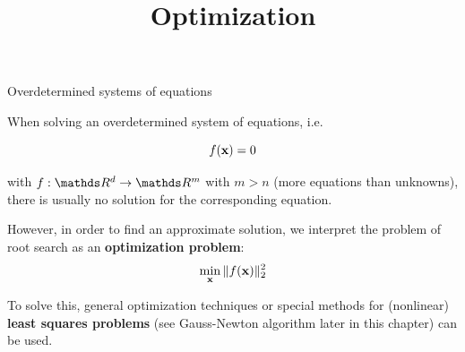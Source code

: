 




\newcommand{\learninggoals}{
\item LEARNING GOAL 1
\item LEARNING GOAL 2}



\title{Optimization}



\sloppy


\begin{vbframe}{Overdetermined systems of equations}

When solving an overdetermined system of equations, i.e.

\vspace*{-0.3cm}
$$
f(\mathbf{x}) = 0
$$

with $f: \R^d \to \R^m$ with $m > n$ (more equations than unknowns), there is usually no solution for the corresponding equation.

\lz

However, in order to find an approximate solution, we interpret the problem of root search as an \textbf{optimization problem}:
$$
\min_{\mathbf{x}}\|f(\mathbf{x})\|_2^2
$$


To solve this, general optimization techniques or special methods for (nonlinear) \textbf{least squares problems} (see Gauss-Newton algorithm later in this chapter) can be used.

\end{vbframe}

